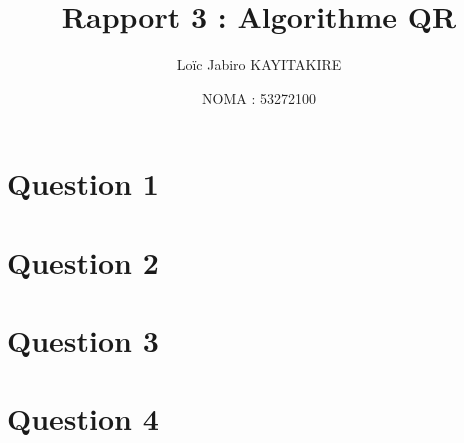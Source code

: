 \documentclass[11pt]{article}
\title{Rapport 3 : Algorithme QR}
\author{Loïc Jabiro KAYITAKIRE}
\date{NOMA : 53272100}
\begin{document}
\maketitle

\section*{Question 1}

\section*{Question 2}

\section*{Question 3}

\section*{Question 4}
\end{document}
